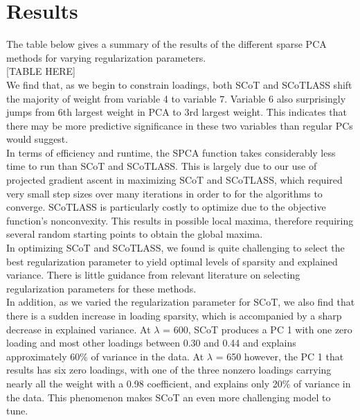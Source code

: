 \documentclass[12pt,letterpaper]{report}
\begin{document}

\section*{Results}

The table below gives a summary of the results of the different sparse PCA methods for varying regularization parameters.\\

[TABLE HERE]\\


We find that, as we begin to constrain loadings, both SCoT and SCoTLASS shift the majority of weight from variable 4 to variable 7. Variable 6 also surprisingly jumps from 6th largest weight in PCA to 3rd largest weight. This indicates that there may be more predictive significance in these two variables than regular PCs would suggest. \\

In terms of efficiency and runtime, the SPCA function takes considerably less time to run than SCoT and SCoTLASS. This is largely due to our use of projected gradient ascent in maximizing SCoT and SCoTLASS, which required very small step sizes over many iterations in order to for the algorithms to converge. SCoTLASS is particularly costly to optimize due to the objective function's nonconvexity. This results in possible local maxima, therefore requiring several random starting points to obtain the global maxima. \\

In optimizing SCoT and SCoTLASS, we found is quite challenging to select the best regularization parameter to yield optimal levels of sparsity and explained variance. There is little guidance from relevant literature on selecting regularization parameters for these methods.\\

In addition, as we varied the regularization parameter for SCoT, we also find that there is a sudden increase in loading sparsity, which is accompanied by a sharp decrease in explained variance. At $\lambda$ = 600, SCoT produces a PC 1 with one zero loading and most other loadings between 0.30 and 0.44 and explains approximately 60\% of variance in the data. At $\lambda$ = 650 however, the PC 1 that results has six zero loadings, with one of the three nonzero loadings carrying nearly all the weight with a 0.98 coefficient, and explains only 20\% of variance in the data. This phenomenon makes SCoT an even more challenging model to tune. 
\end{document}
